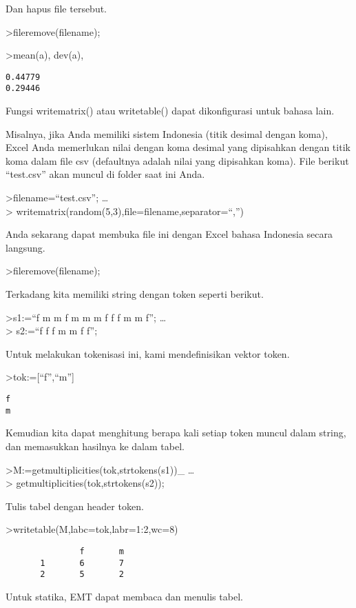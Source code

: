 \documentclass[
]{book}
\begin{document}
Dan hapus file tersebut.

\textgreater fileremove(filename);

\textgreater mean(a), dev(a),

\begin{verbatim}
0.44779
0.29446
\end{verbatim}

Fungsi writematrix() atau writetable() dapat dikonfigurasi untuk bahasa lain.

Misalnya, jika Anda memiliki sistem Indonesia (titik desimal dengan koma), Excel Anda memerlukan nilai dengan koma desimal yang dipisahkan dengan titik koma dalam file csv (defaultnya adalah nilai yang dipisahkan koma). File berikut ``test.csv'' akan muncul di folder saat ini Anda.

\textgreater filename=``test.csv''; \ldots{}\\
\textgreater{} writematrix(random(5,3),file=filename,separator=``,'')

Anda sekarang dapat membuka file ini dengan Excel bahasa Indonesia secara langsung.

\textgreater fileremove(filename);

Terkadang kita memiliki string dengan token seperti berikut.

\textgreater s1:=``f m m f m m m f f f m m f''; \ldots{}\\
\textgreater{} s2:=``f f f m m f f'';

Untuk melakukan tokenisasi ini, kami mendefinisikan vektor token.

\textgreater tok:={[}``f'',``m''{]}

\begin{verbatim}
f
m
\end{verbatim}

Kemudian kita dapat menghitung berapa kali setiap token muncul dalam string, dan memasukkan hasilnya ke dalam tabel.

\textgreater M:=getmultiplicities(tok,strtokens(s1))\_ \ldots{}\\
\textgreater{} getmultiplicities(tok,strtokens(s2));

Tulis tabel dengan header token.

\textgreater writetable(M,labc=tok,labr=1:2,wc=8)

\begin{verbatim}
               f       m
       1       6       7
       2       5       2
\end{verbatim}

Untuk statika, EMT dapat membaca dan menulis tabel.
\end{document}
